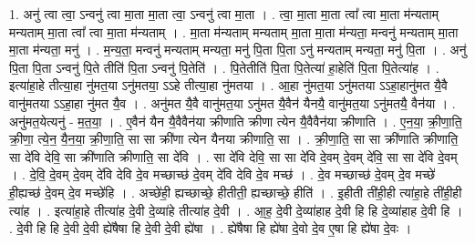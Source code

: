 \documentclass[17pt]{extarticle}
\begin{document}
1. अनु॑ त्वा त्वा॒ ऽन्वनु॑ त्वा मा॒ता मा॒ता त्वा॒ ऽन्वनु॑ त्वा मा॒ता । . त्वा॒ मा॒ता मा॒ता त्वा᳚ त्वा मा॒ता म॑न्यताम् मन्यताम् मा॒ता त्वा᳚ त्वा मा॒ता म॑न्यताम् । . मा॒ता म॑न्यताम् मन्यताम् मा॒ता मा॒ता म॑न्यता॒ मन्वनु॑ मन्यताम् मा॒ता मा॒ता म॑न्यता॒ मनु॑ । . म॒न्य॒ता॒ मन्वनु॑ मन्यताम् मन्यता॒ मनु॑ पि॒ता पि॒ता ऽनु॑ मन्यताम् मन्यता॒ मनु॑ पि॒ता । . अनु॑ पि॒ता पि॒ता ऽन्वनु॑ पि॒ते तीति॑ पि॒ता ऽन्वनु॑ पि॒तेति॑ । . पि॒तेतीति॑ पि॒ता पि॒तेत्या॑ हा॒हेति॑ पि॒ता पि॒तेत्या॑ह । . इत्या॑हा॒हे तीत्या॒हा नु॑मत॒या ऽनु॑मतया॒ ऽऽहे तीत्या॒हा नु॑मतया । . आ॒हा नु॑मत॒या ऽनु॑मतया ऽऽहा॒हानु॑मत यै॒वै वानु॑मतया ऽऽहा॒हा नु॑मत यै॒व । . अनु॑मत यै॒वै वानु॑मत॒या ऽनु॑मत यै॒वैन॑ यैनयै॒ वानु॑मत॒या ऽनु॑मतयै॒ वैन॑या । . अनु॑मत॒येत्यनु॑ - म॒त॒या॒ । . ए॒वैन॑ यैन यै॒वैवैन॑या क्रीणाति क्रीणा त्येन यै॒वैवैन॑या क्रीणाति । . ए॒न॒या॒ क्री॒णा॒ति॒ क्री॒णा॒ त्ये॒न॒ यै॒न॒या॒ क्री॒णा॒ति॒ सा सा क्री॑णा त्येन यैनया क्रीणाति॒ सा । . क्री॒णा॒ति॒ सा सा क्री॑णाति क्रीणाति॒ सा दे॑वि देवि॒ सा क्री॑णाति क्रीणाति॒ सा दे॑वि । . सा दे॑वि देवि॒ सा सा दे॑वि दे॒वम् दे॒वम् दे॑वि॒ सा सा दे॑वि दे॒वम् । . दे॒वि॒ दे॒वम् दे॒वम् दे॑वि देवि दे॒व मच्छाच्छ॑ दे॒वम् दे॑वि देवि दे॒व मच्छ॑ । . दे॒व मच्छाच्छ॑ दे॒वम् दे॒व मच्छे॑ ही॒ह्यच्छ॑ दे॒वम् दे॒व मच्छे॑हि । . अच्छे॑ही॒ ह्यच्छाच्छे॒ हीतीती॒ ह्यच्छाच्छे॒ हीति॑ । . इ॒हीती ती॑ही॒ही त्या॑हा॒हे ती॑ही॒ही त्या॑ह । . इत्या॑हा॒हे तीत्या॑ह दे॒वी दे॒व्या॑हे तीत्या॑ह दे॒वी । . आ॒ह॒ दे॒वी दे॒व्या॑हाह दे॒वी हि हि दे॒व्या॑हाह दे॒वी हि । . दे॒वी हि हि दे॒वी दे॒वी ह्ये॑षैषा हि दे॒वी दे॒वी ह्ये॑षा । . ह्ये॑षैषा हि ह्ये॑षा दे॒वो दे॒व ए॒षा हि ह्ये॑षा दे॒वः । \newline
\end{document}
